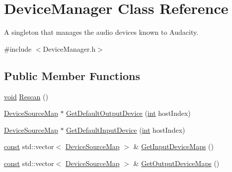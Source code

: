 \hypertarget{class_device_manager}{}\section{Device\+Manager Class Reference}
\label{class_device_manager}


A singleton that manages the audio devices known to Audacity.  




{\ttfamily \#include $<$Device\+Manager.\+h$>$}

\subsection*{Public Member Functions}
\begin{DoxyCompactItemize}
\item 
\hyperlink{sound_8c_ae35f5844602719cf66324f4de2a658b3}{void} \hyperlink{class_device_manager_a2577392de312eea072028c0d8084bda3}{Rescan} ()
\item 
\hyperlink{struct_device_source_map}{Device\+Source\+Map} $\ast$ \hyperlink{class_device_manager_af6501aeffbc1ae4a23bd3e966a6e34a6}{Get\+Default\+Output\+Device} (\hyperlink{xmltok_8h_a5a0d4a5641ce434f1d23533f2b2e6653}{int} host\+Index)
\item 
\hyperlink{struct_device_source_map}{Device\+Source\+Map} $\ast$ \hyperlink{class_device_manager_a61304dfc24c94f9ce802f3ede5950d6b}{Get\+Default\+Input\+Device} (\hyperlink{xmltok_8h_a5a0d4a5641ce434f1d23533f2b2e6653}{int} host\+Index)
\item 
\hyperlink{getopt1_8c_a2c212835823e3c54a8ab6d95c652660e}{const} std\+::vector$<$ \hyperlink{struct_device_source_map}{Device\+Source\+Map} $>$ \& \hyperlink{class_device_manager_a796cab61657b1b2a865f3adcee894d15}{Get\+Input\+Device\+Maps} ()
\item 
\hyperlink{getopt1_8c_a2c212835823e3c54a8ab6d95c652660e}{const} std\+::vector$<$ \hyperlink{struct_device_source_map}{Device\+Source\+Map} $>$ \& \hyperlink{class_device_manager_a9365e768ce3f227acff567b3f8336d63}{Get\+Output\+Device\+Maps} ()
\end{DoxyCompactItemize}
